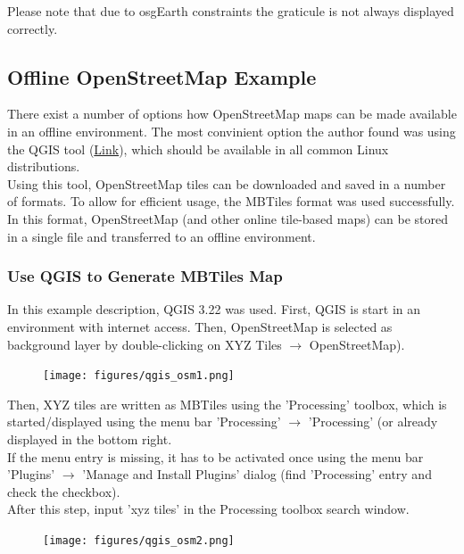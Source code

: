 Please note that due to osgEarth constraints the graticule is not always displayed correctly. \\

\subsection{Offline OpenStreetMap Example}

There exist a number of options how OpenStreetMap maps can be made available in an offline environment. The most convinient option the author found was using the QGIS tool (\href{https://www.qgis.org/}{Link}), which should be available in all common Linux distributions. \\

Using this tool, OpenStreetMap tiles can be downloaded and saved in a number of formats. To allow for efficient usage, the MBTiles format was used successfully. In this format, OpenStreetMap (and other online tile-based maps) can be stored in a single file and transferred to an offline environment.

\subsubsection{Use QGIS to Generate MBTiles Map}

In this example description, QGIS 3.22 was used. First, QGIS is start in an environment with internet access. Then, OpenStreetMap is selected as background layer by double-clicking on XYZ Tiles $\rightarrow$ OpenStreetMap).

\begin{figure}[H]
    \hspace*{-2cm}
    \texttt{[image: figures/qgis\_osm1.png]}
\end{figure}

Then, XYZ tiles are written as MBTiles using the 'Processing' toolbox, which is started/displayed using the menu bar 'Processing' $\rightarrow$ 'Processing' (or already displayed in the bottom right. \\

If the menu entry is missing, it has to be activated once using the menu bar 'Plugins' $\rightarrow$ 'Manage and Install Plugins' dialog (find 'Processing' entry and check the checkbox). \\

After this step, input 'xyz tiles' in the Processing toolbox search window.

\begin{figure}[H]
    \hspace*{-2cm}
    \texttt{[image: figures/qgis\_osm2.png]}
\end{figure}

